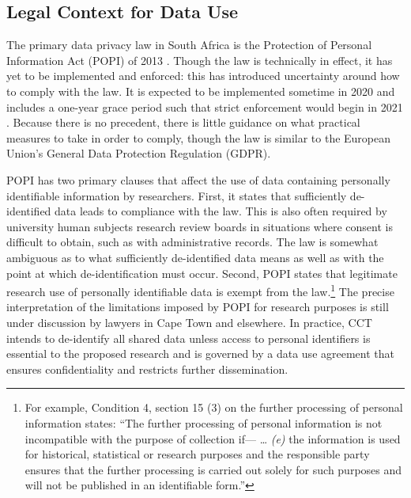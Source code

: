 \hypertarget{legal-context-for-data-use-5}{%
\subsection{Legal Context for Data Use}\label{legal-context-for-data-use-5}}

The primary data privacy law in South Africa is the Protection of Personal Information Act (POPI) of 2013 \citep{republicofsouthafrica2013}. Though the law is technically in effect, it has yet to be implemented and enforced: this has introduced uncertainty around how to comply with the law. It is expected to be implemented sometime in 2020 and includes a one-year grace period such that strict enforcement would begin in 2021 \citep{giles2020}. Because there is no precedent, there is little guidance on what practical measures to take in order to comply, though the law is similar to the European Union's General Data Protection Regulation (GDPR).

POPI has two primary clauses that affect the use of data containing personally identifiable information by researchers. First, it states that sufficiently de-identified data leads to compliance with the law. This is also often required by university human subjects research review boards in situations where consent is difficult to obtain, such as with administrative records. The law is somewhat ambiguous as to what sufficiently de-identified data means as well as with the point at which de-identification must occur. Second, POPI states that legitimate research use of personally identifiable data is exempt from the law.\footnote{For example, Condition 4, section 15 (3) on the further processing of personal information states: ``The further processing of personal information is not incompatible with the purpose of collection if--- \ldots{} \emph{(e)} the information is used for historical, statistical or research purposes and the responsible party ensures that the further processing is carried out solely for such purposes and will not be published in an identifiable form.''} The precise interpretation of the limitations imposed by POPI for research purposes is still under discussion by lawyers in Cape Town and elsewhere. In practice, CCT intends to de-identify all shared data unless access to personal identifiers is essential to the proposed research and is governed by a data use agreement that ensures confidentiality and restricts further dissemination.

